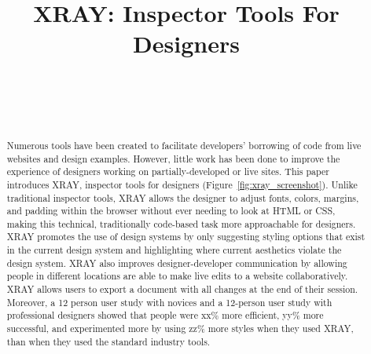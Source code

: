 \documentclass{sigchi}
\newcommand{\xray}{XRAY\xspace}
\def\plaintitle{XRAY: Inspector Tools For Designers}
\begin{document}
\title{\plaintitle}

\author{%
  \\
  \\
  \\
}

\maketitle

\begin{abstract}
Numerous tools have been created to facilitate developers' borrowing of code from live websites and design examples. However, little work has been done to improve the experience of designers working on partially-developed or live sites. This paper introduces \xray, inspector tools for designers (Figure~\ref{fig:xray_screenshot}). Unlike traditional inspector tools, \xray allows the designer to adjust fonts, colors, margins, and padding within the browser without ever needing to look at HTML or CSS, making this technical, traditionally code-based task more approachable for designers. \xray promotes the use of design systems by only suggesting styling options that exist in the current design system and highlighting where current aesthetics violate the design system. \xray also improves designer-developer communication by allowing people in different locations are able to make live edits to a website collaboratively. \xray allows users to export a document with all changes at the end of their session. 
Moreover, a 12 person user study with novices and a 12-person user study with professional designers showed that people were xx\% more efficient, yy\% more successful, and experimented more by using zz\% more styles when they used \xray, than when they used the standard industry tools. 
\end{abstract}
\end{document}
